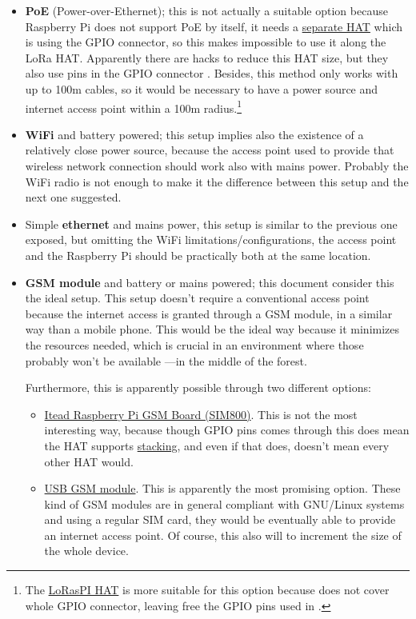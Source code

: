 \documentclass[11pt,a4paper,dvipsnames,twoside]{article}
\begin{document}
\begin{itemize}
  \item \textbf{PoE} (Power-over-Ethernet); this is not actually a suitable option because Raspberry Pi does not support PoE by itself, it needs a \href{https://www.raspberrypi.org/products/poe-hat/}{separate HAT} which is using the GPIO connector, so this makes impossible to use it along the LoRa HAT. Apparently there are hacks to reduce this HAT size, but they also use pins in the GPIO connector \cite{RaspiPoEHack}. Besides, this method only works with up to 100m cables, so it would be necessary to have a power source and internet access point within a 100m radius.\footnote{The \href{https://github.com/hallard/LoRasPI}{LoRasPI HAT} is more suitable for this option because does not cover whole GPIO connector, leaving free the GPIO pins used in \cite{RaspiPoEHack}.}
  \item \textbf{WiFi} and battery powered; this setup implies also the existence of a relatively close power source, because the access point used to provide that wireless network connection should work also with mains power. Probably the WiFi radio is not enough to make it the difference between this setup and the next one suggested.
  \item Simple \textbf{ethernet} and mains power, this setup is similar to the previous one exposed, but omitting the WiFi limitations/configurations, the access point and the Raspberry Pi should be practically both at the same location.
  \item \textbf{GSM module} and battery or mains powered; this document consider this the ideal setup. This setup doesn't require a conventional access point because the internet access is granted through a GSM module, in a similar way than a mobile phone. This would be the ideal way because it minimizes the resources needed, which is crucial in an environment where those probably won't be available ---in the middle of the forest.
  
  Furthermore, this is apparently possible through two different options:
    \begin{itemize}
      \item \href{https://www.itead.cc/wiki/RPI_SIM800_GSM/GPRS_ADD-ON_V2.0}{Itead Raspberry Pi GSM Board (SIM800)}. This is not the most interesting way, because though GPIO pins comes through this does mean the HAT supports \href{http://www.pi-in-the-sky.com/index.php?id=stacking-guide}{stacking}, and even if that does, doesn't mean every other HAT would.
      \item \href{https://tutorials-raspberrypi.com/raspberry-pi-gsm-module-mobile-internet-lte-3g-umts/}{USB GSM module}. This is apparently the most promising option. These kind of GSM modules are in general compliant with GNU/Linux systems and using a regular SIM card, they would be eventually able to provide an internet access point. Of course, this also will to increment the size of the whole device.
    \end{itemize}
\end{itemize}
\end{document}
